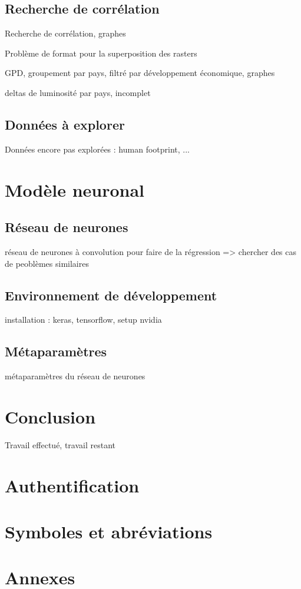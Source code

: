\documentclass[a4paper]{report}
\begin{document}
\section{Recherche de corrélation}
Recherche de corrélation, graphes

Problème de format pour la superposition des rasters


GPD, groupement par pays, filtré par développement économique, graphes

deltas de luminosité par pays, incomplet

\section{Données à explorer}
Données encore pas explorées : human footprint, ...

\chapter{Modèle neuronal}
\section{Réseau de neurones}
réseau de neurones à convolution pour faire de la régression => chercher des cas de peoblèmes similaires

\section{Environnement de développement}
installation : keras, tensorflow, setup nvidia

\section{Métaparamètres}
métaparamètres du réseau de neurones

\chapter{Conclusion}
Travail effectué, travail restant

\printbibliography

\chapter{Authentification}


\chapter{Symboles et abréviations}


\listoffigures

\chapter{Annexes}
\end{document}
